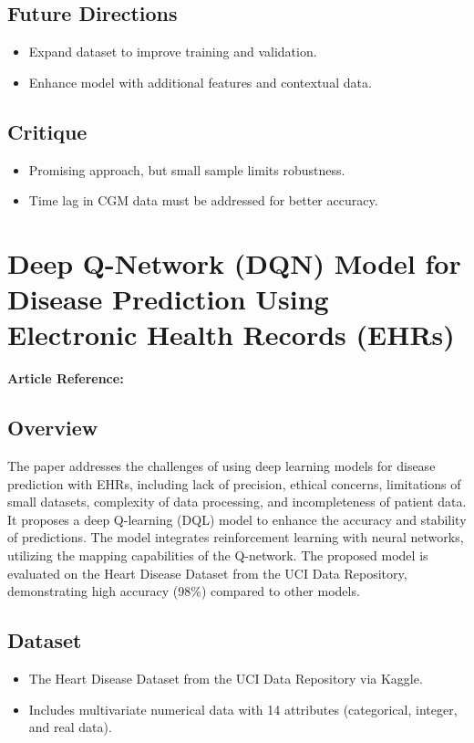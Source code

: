 \subsection*{Future Directions}
\begin{itemize}
    \item Expand dataset to improve training and validation.
    \item Enhance model with additional features and contextual data.
\end{itemize}

\subsection*{Critique}
\begin{itemize}
    \item Promising approach, but small sample limits robustness.
    \item Time lag in CGM data must be addressed for better accuracy.
\end{itemize}


\section{Deep Q-Network (DQN) Model for Disease Prediction Using Electronic Health Records (EHRs)}
\textbf{Article Reference:} \cite{article_10}

\subsection*{Overview}
The paper addresses the challenges of using deep learning models for disease prediction with EHRs, including lack of precision, ethical concerns, limitations of small datasets, complexity of data processing, and incompleteness of patient data. It proposes a deep Q-learning (DQL) model to enhance the accuracy and stability of predictions. The model integrates reinforcement learning with neural networks, utilizing the mapping capabilities of the Q-network. The proposed model is evaluated on the Heart Disease Dataset from the UCI Data Repository, demonstrating high accuracy (98\%) compared to other models.

\subsection*{Dataset}
\begin{itemize}
    \item The Heart Disease Dataset from the UCI Data Repository via Kaggle.
    \item Includes multivariate numerical data with 14 attributes (categorical, integer, and real data).
\end{itemize}

